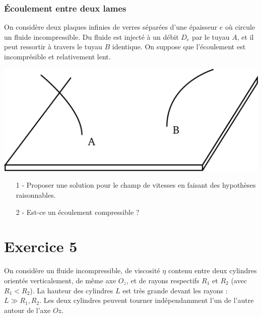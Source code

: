 \documentclass{report}
\begin{document}
\subsubsection*{Écoulement entre deux lames}

On considère deux plaques infinies de verres séparées d'une épaisseur $e$ où circule un fluide incompressible. Du fluide est injecté à un débit $D_e$ par le tuyau $A$, et il peut ressortir à travers le tuyau $B$ identique. On suppose que l'écoulement est incomprésible et relativement lent.

\begin{center}
	\includegraphics[scale=0.25]{plaque.pdf}
\end{center}

\begin{itemize}
	\item[1 - ] Proposer une solution pour le champ de vitesses en faisant des hypothèses raisonnables.
	\item[2 - ] Est-ce un écoulement compressible ?
\end{itemize}

\newpage

\section*{Exercice 5}

On considère un fluide incompressible, de viscosité $\eta$ contenu entre deux cylindres orientés verticalement, de même axe $O_z$, et de rayons respectifs $R_1$ et $R_2$ (avec $R_1<R_2$). La hauteur des cylindres $L$ est très grande devant les rayons : $L\gg R_1, R_2$. Les deux cylindres peuvent tourner indépendamment l'un de l'autre autour de l'axe $Oz$. 
\end{document}
